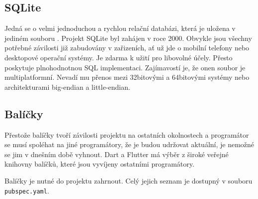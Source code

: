 \documentclass[
  biblatex,
  figures=true,
  tables=false,
  glossaries,
  index
]{kidiplom}
\begin{document}
\subsection{SQLite}
Jedná se o velmi jednoduchou a rychlou relační databázi, která je uložena v jediném souboru \cite{sqlite}. Projekt SQLite byl zahájen v roce 2000. Obvykle jsou všechny potřebné závilosti již zabudovány v zařizeních, ať už jde o mobilní telefony nebo desktopové operační systémy. Je zdarma k užití pro libovolné účely. Přesto poskytuje plnohodnotnou SQL implementaci. Zajímavostí je, že onen soubor je multiplatformní. Nevadí mu přenos mezi 32bitovými a 64bitovými systémy nebo architekturami big-endian a little-endian.

\subsection{Balíčky}

Přestože balíčky tvoří závilosti projektu na ostatních okolnostech a programátor se musí spoléhat na jiné programátory, že je budou udržovat aktuální, je nemožné se jim v dnešním době vyhnout. Dart a Flutter má výběr z široké veřejné knihovny balíčků, které jsou vyvíjeny ostatními programátory. 

Balíčky je nutné do projektu zahrnout. Celý jejich seznam je dostupný v souboru \verb|pubspec.yaml|. 
\end{document}
